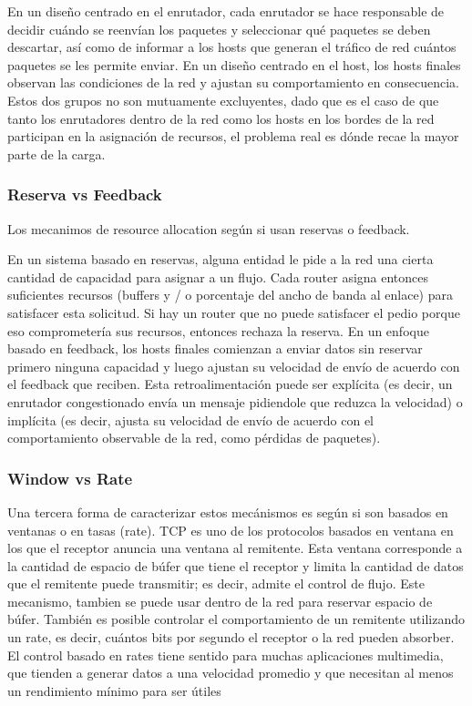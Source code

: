En un diseño centrado en el enrutador, cada enrutador se hace responsable de decidir cuándo se reenvían los paquetes y seleccionar qué paquetes se deben descartar, así como de informar a los hosts que generan el tráfico de red cuántos paquetes se les permite enviar. En un diseño centrado en el host, los hosts finales observan las condiciones de la red y ajustan su comportamiento en consecuencia. Estos dos grupos no son mutuamente excluyentes, dado que es el caso de que tanto los enrutadores dentro de la red como los hosts en los bordes de la red participan en la asignación de recursos, el problema real es dónde recae la mayor parte de la carga.

\subsubsection*{Reserva vs Feedback}
Los mecanimos de resource allocation según si usan reservas o feedback.

En un sistema basado en reservas, alguna entidad le pide a la red una cierta cantidad de capacidad para asignar a un flujo. Cada router asigna entonces suficientes recursos (buffers y / o porcentaje del ancho de banda al enlace) para satisfacer esta solicitud. Si hay un router que no puede satisfacer el pedio porque eso comprometería sus recursos, entonces rechaza la reserva. En un enfoque basado en feedback, los hosts finales comienzan a enviar datos sin reservar primero ninguna capacidad y luego ajustan su velocidad de envío de acuerdo con el feedback que reciben. Esta retroalimentación puede ser explícita (es decir, un enrutador congestionado envía un mensaje pidiendole que reduzca la velocidad) o implícita (es decir, ajusta su velocidad de envío de acuerdo con el comportamiento observable de la red, como pérdidas de paquetes).

\subsubsection*{Window vs Rate}
Una tercera forma de caracterizar estos mecánismos es según si son basados en ventanas o en tasas (rate). TCP es uno de los protocolos basados en ventana en los que el receptor anuncia una ventana al remitente. Esta ventana corresponde a la cantidad de espacio de búfer que tiene el receptor y limita la cantidad de datos que el remitente puede transmitir; es decir, admite el control de flujo. Este mecanismo, tambien se puede usar dentro de la red para reservar espacio de búfer. También es posible controlar el comportamiento de un remitente utilizando un rate, es decir, cuántos bits por segundo el receptor o la red pueden absorber. El control basado en rates tiene sentido para muchas aplicaciones multimedia, que tienden a generar datos a una velocidad promedio y que necesitan al menos un rendimiento mínimo para ser útiles

